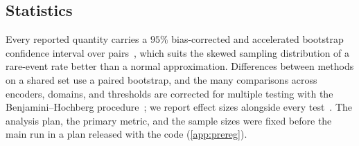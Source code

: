\subsection{Statistics}
Every reported quantity carries a $95\%$ bias-corrected and accelerated bootstrap
confidence interval over pairs~\cite{efron1987bootstrap,efron1993bootstrap}, which suits
the skewed sampling distribution of a rare-event rate better than a normal
approximation. Differences between methods on a shared set use a paired bootstrap, and
the many comparisons across encoders, domains, and thresholds are corrected for multiple
testing with the Benjamini--Hochberg procedure~\cite{benjamini1995fdr}; we report effect
sizes alongside every test~\cite{dror2018hitchhiker}. The analysis plan, the primary
metric, and the sample sizes were fixed before the main run in a plan released with the code
(\cref{app:prereg}).
